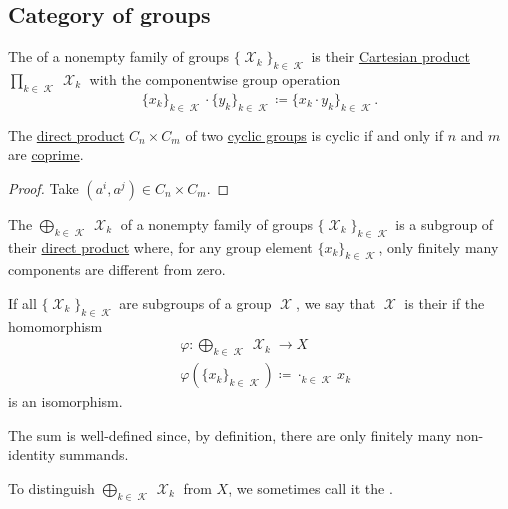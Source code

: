 \subsection{Category of groups}\label{subsec:category_of_groups}

\begin{definition}\label{def:group_direct_product}
  The  of a nonempty family of groups \( \{ \mscrX_k \}_{k \in \mscrK} \) is their \hyperref[def:cartesian_product]{Cartesian product} \( \prod_{k \in \mscrK} \mscrX_k \) with the componentwise group operation
  \begin{equation*}
    \{ x_k \}_{k \in \mscrK} \cdot \{ y_k \}_{k \in \mscrK}
    \coloneqq
    \{ x_k \cdot y_k \}_{k \in \mscrK}.
  \end{equation*}
\end{definition}

\begin{proposition}\label{thm:product_of_cyclic_groups}
  The \hyperref[def:group_direct_product]{direct product} \( C_n \times C_m \) of two \hyperref[def:cyclic_group]{cyclic groups} is cyclic if and only if \( n \) and \( m \) are \hyperref[def:coprime_numbers]{coprime}.
\end{proposition}
\begin{proof}
  Take \( (a^i, a^j) \in C_n \times C_m \).
\end{proof}

\begin{definition}\label{def:group_direct_sum}
  The  \( \bigoplus_{k \in \mscrK} \mscrX_k \) of a nonempty family of groups \( \{ \mscrX_k \}_{k \in \mscrK} \) is a subgroup of their \hyperref[def:group_direct_sum]{direct product} where, for any group element \( \{ x_k \}_{k \in \mscrK} \), only finitely many components are different from zero.

  \begin{thmenum}
    If all \( \{ \mscrX_k \}_{k \in \mscrK} \) are subgroups of a group \( \mscrX \), we say that \( \mscrX \) is their  if the homomorphism
    \begin{align*}
       &\varphi: \bigoplus_{k \in \mscrK} \mscrX_k \to X \\
       &\varphi(\{ x_k \}_{k \in \mscrK}) \coloneqq \cdot_{k \in \mscrK} x_k
    \end{align*}
    is an isomorphism.

    The sum is well-defined since, by definition, there are only finitely many non-identity summands.

     To distinguish \( \bigoplus_{k \in \mscrK} \mscrX_k \) from \( X \), we sometimes call it the .
  \end{thmenum}
\end{definition}

